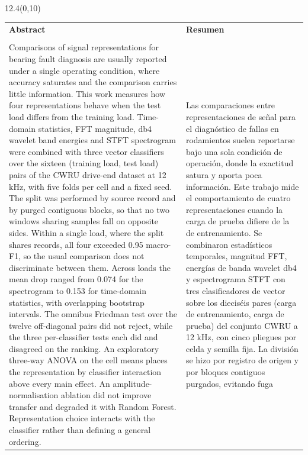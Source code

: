 \documentclass[12pt,twoside,titlepage]{ingenius}
\begin{document}
\begin{textblock}{12.4}(0,10)
\adscripcion
\end{textblock}
\begin{table}[htb]
\begin{tabular}{p{8cm}p{8cm}}
{\Large \bfseries Abstract} &{\Large \bfseries Resumen} \\ \\
Comparisons of signal representations for bearing fault diagnosis are usually
reported under a single operating condition, where accuracy saturates and the
comparison carries little information. This work measures how four
representations behave when the test load differs from the training load.
Time-domain statistics, FFT magnitude, db4 wavelet band energies and STFT
spectrogram were combined with three vector classifiers over the sixteen
(training load, test load) pairs of the CWRU drive-end dataset at 12 kHz, with
five folds per cell and a fixed seed. The split was performed by source record
and by purged contiguous blocks, so that no two windows sharing samples fall on
opposite sides. Within a single load, where the split shares records,
all four exceeded 0.95 macro-F1, so the
usual comparison does not discriminate between them. Across loads the mean drop
ranged from 0.074 for the spectrogram to 0.153 for time-domain statistics, with
overlapping bootstrap intervals. The
omnibus Friedman test over the twelve off-diagonal pairs did not reject, while
the three per-classifier tests each did and disagreed on the ranking. An
exploratory three-way ANOVA on the cell means places the representation by
classifier interaction above every main effect. An amplitude-normalisation
ablation did not improve transfer and degraded it with Random Forest. Representation choice interacts with the classifier rather
than defining a general ordering.
&
Las comparaciones entre representaciones de señal para el diagnóstico de fallas
en rodamientos suelen reportarse bajo una sola condición de operación, donde la
exactitud satura y aporta poca información. Este trabajo mide el
comportamiento de cuatro representaciones cuando la carga de prueba difiere de
la de entrenamiento. Se combinaron estadísticos temporales, magnitud FFT,
energías de banda wavelet db4 y espectrograma STFT con tres clasificadores de
vector sobre los dieciséis pares (carga de entrenamiento, carga de prueba) del
conjunto CWRU a 12 kHz, con cinco pliegues por celda y semilla fija. La división
se hizo por registro de origen y por bloques contiguos purgados, evitando fuga

\end{tabular}
\end{table}
\end{document}

